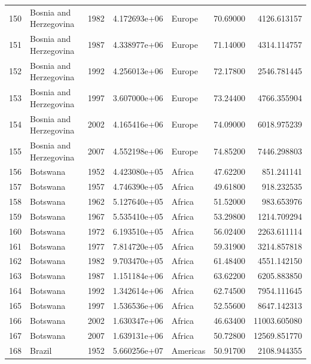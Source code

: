 \documentclass[
  letterpaper,
  DIV=11,
  numbers=noendperiod]{scrreprt}
\begin{document}
\begin{tabular}{llrrlrr}
150  &    Bosnia and Herzegovina &  1982 &  4.172693e+06 &    Europe &  70.69000 &    4126.613157 \\
151  &    Bosnia and Herzegovina &  1987 &  4.338977e+06 &    Europe &  71.14000 &    4314.114757 \\
152  &    Bosnia and Herzegovina &  1992 &  4.256013e+06 &    Europe &  72.17800 &    2546.781445 \\
153  &    Bosnia and Herzegovina &  1997 &  3.607000e+06 &    Europe &  73.24400 &    4766.355904 \\
154  &    Bosnia and Herzegovina &  2002 &  4.165416e+06 &    Europe &  74.09000 &    6018.975239 \\
155  &    Bosnia and Herzegovina &  2007 &  4.552198e+06 &    Europe &  74.85200 &    7446.298803 \\
156  &                  Botswana &  1952 &  4.423080e+05 &    Africa &  47.62200 &     851.241141 \\
157  &                  Botswana &  1957 &  4.746390e+05 &    Africa &  49.61800 &     918.232535 \\
158  &                  Botswana &  1962 &  5.127640e+05 &    Africa &  51.52000 &     983.653976 \\
159  &                  Botswana &  1967 &  5.535410e+05 &    Africa &  53.29800 &    1214.709294 \\
160  &                  Botswana &  1972 &  6.193510e+05 &    Africa &  56.02400 &    2263.611114 \\
161  &                  Botswana &  1977 &  7.814720e+05 &    Africa &  59.31900 &    3214.857818 \\
162  &                  Botswana &  1982 &  9.703470e+05 &    Africa &  61.48400 &    4551.142150 \\
163  &                  Botswana &  1987 &  1.151184e+06 &    Africa &  63.62200 &    6205.883850 \\
164  &                  Botswana &  1992 &  1.342614e+06 &    Africa &  62.74500 &    7954.111645 \\
165  &                  Botswana &  1997 &  1.536536e+06 &    Africa &  52.55600 &    8647.142313 \\
166  &                  Botswana &  2002 &  1.630347e+06 &    Africa &  46.63400 &   11003.605080 \\
167  &                  Botswana &  2007 &  1.639131e+06 &    Africa &  50.72800 &   12569.851770 \\
168  &                    Brazil &  1952 &  5.660256e+07 &  Americas &  50.91700 &    2108.944355 \\

\end{tabular}
\end{document}
